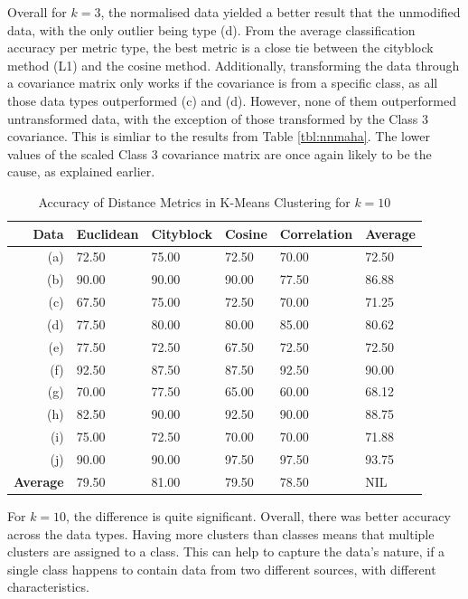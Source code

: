 \documentclass[a4paper, 10pt, conference]{ieeeconf}
\begin{document}
Overall for $k=3$, the normalised data yielded a better result that the unmodified data, with the only outlier being type (d). From the average classification accuracy per metric type, the best metric is a close tie between the cityblock method (L1) and the cosine method. Additionally, transforming the data through a covariance matrix only works if the covariance is from a specific class, as all those data types outperformed (c) and (d). However, none of them outperformed untransformed data, with the exception of those transformed by the Class 3 covariance. This is simliar to the results from Table \ref{tbl:nnmaha}. The lower values of the scaled Class 3 covariance matrix are once again likely to be the cause, as explained earlier.

\begin{table}[!ht]
\centering
\caption{Accuracy of Distance Metrics in K-Means Clustering for $k = 10$}
\label{tbl:k10}
\begin{tabular}{|r|lllll|}
\hline
\textbf{Data} & \textbf{Euclidean} & \textbf{Cityblock} & \textbf{Cosine} & \textbf{Correlation} & \textbf{Average}\\ \hline
(a) & 72.50 & 75.00 & 72.50 & 70.00 & 72.50\\
(b) & 90.00 & 90.00 & 90.00 & 77.50 & 86.88\\
(c) & 67.50 & 75.00 & 72.50 & 70.00 & 71.25\\
(d) & 77.50 & 80.00 & 80.00 & 85.00 & 80.62\\
(e) & 77.50 & 72.50 & 67.50 & 72.50 & 72.50\\
(f) & 92.50 & 87.50 & 87.50 & 92.50 & 90.00\\
(g) & 70.00 & 77.50 & 65.00 & 60.00 & 68.12\\
(h) & 82.50 & 90.00 & 92.50 & 90.00 & 88.75\\
(i) & 75.00 & 72.50 & 70.00 & 70.00 & 71.88\\
(j) & 90.00 & 90.00 & 97.50 & 97.50 & 93.75\\
\textbf{Average} & 79.50 & 81.00 & 79.50 & 78.50 & NIL \\ \hline
\end{tabular}
\end{table}

For $k=10$, the difference is quite significant. Overall, there was better accuracy across the data types. Having more clusters than classes means that multiple clusters are assigned to a class. This can help to capture the data's nature, if a single class happens to contain data from two different sources, with different characteristics.
\end{document}
